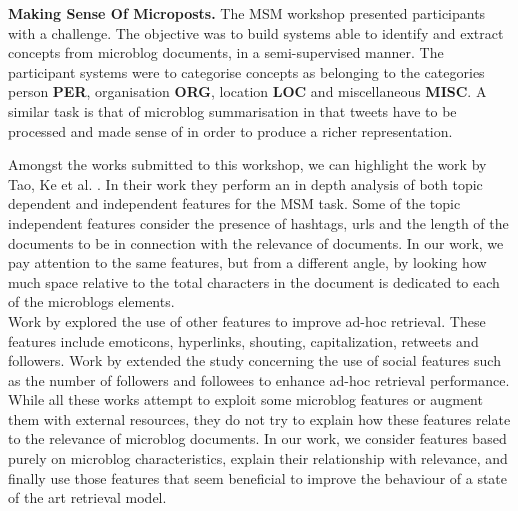 
\noindent \textbf{Making Sense Of Microposts.} The MSM workshop \cite{basave2013making} presented participants with a challenge. The objective was to build systems able to identify and extract concepts from microblog documents, in a semi-supervised manner. The participant systems were to categorise concepts as belonging to the categories person \textbf{PER}, organisation \textbf{ORG}, location \textbf{LOC} and miscellaneous \textbf{MISC}. A similar task is that of microblog summarisation \cite{5590862} in that tweets have to be processed and made sense of in order to produce a richer representation.

Amongst the works submitted to this workshop, we can highlight the work by Tao, Ke et al. \cite{tao2012makes}. In their work they perform an in depth analysis of both topic dependent and independent features for the MSM task. Some of the topic independent features consider the presence of hashtags, urls and the length of the documents to be in connection with the relevance of documents. In our work, we pay attention to the same features, but from a different angle, by looking how much space relative to the total characters in the document is dedicated to each of the microblogs elements. \\




Work by \cite{massoudi2011incorporating} explored the use of other features to improve ad-hoc retrieval. These features include emoticons, hyperlinks, shouting, capitalization, retweets and followers. 
Work by \cite{nagmoti2010ranking} extended the study concerning the use of social features such as the number of followers and followees to enhance ad-hoc retrieval performance.
While all these works attempt to exploit some microblog features or augment them with external resources, they do not try to explain how these features relate to the relevance of microblog documents. In our work, we consider features based purely on microblog characteristics, explain their relationship with relevance, and finally use those features that seem beneficial to improve the behaviour of a state of the art retrieval model.

